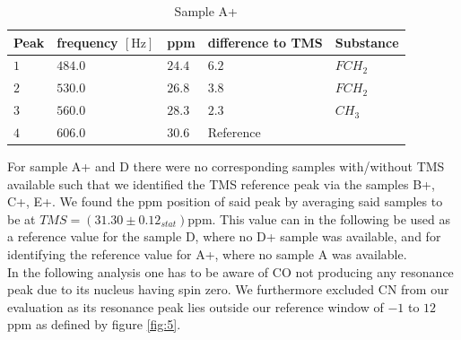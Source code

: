 \begin{table}[h]
	\centering
	\begin{tabular}{lllll}
		\toprule
		Peak & frequency $\left[\mathrm{Hz}\right]$ & ppm & difference to TMS & Substance \\
		\midrule
		$ 1$ & $484.0$ & $24.4$ & $6.2$ & $FCH_2$\\
		
		$ 2$ & $530.0$ & $26.8$ &$ 3.8$ & $FCH_2$\\
		
		$ 3$ & $560.0$ &$28.3$ &$ 2.3$ & $CH_3$\\
		
		$ 4$ & $606.0$ &$ 30.6$ & Reference & \\
		
		\bottomrule
	\end{tabular}
	\caption{Sample A+}
	\label{tab:2}
\end{table}
\noindent
For sample A+ and D there were no corresponding samples with/without TMS available such that we identified the TMS reference peak via the samples B+, C+, E+. We found the ppm position of said peak by averaging said samples to be at $ TMS = \left(31.30 \pm 0.12_{stat} \right) \mathrm{ppm}$. This value can in the following be used as a reference value for the sample D, where no D+ sample was available, and for identifying the reference value for A+, where no sample A was available.\\
In the following analysis one has to be aware of CO not producing any resonance peak due to its nucleus having spin zero. We furthermore excluded CN from our evaluation as its resonance peak lies outside our reference window of $-1$ to $12$ ppm as defined by figure \ref{fig:5}.


